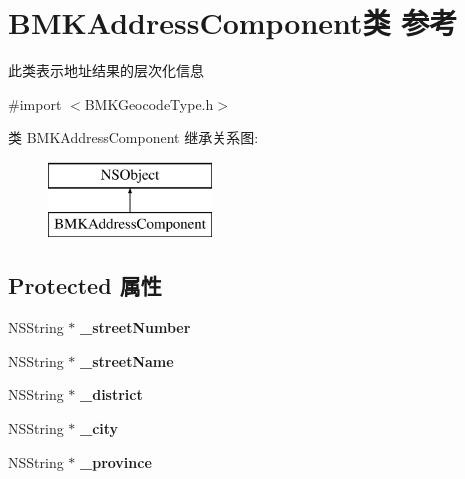 \hypertarget{interface_b_m_k_address_component}{\section{B\+M\+K\+Address\+Component类 参考}
\label{interface_b_m_k_address_component}
}


此类表示地址结果的层次化信息  




{\ttfamily \#import $<$B\+M\+K\+Geocode\+Type.\+h$>$}

类 B\+M\+K\+Address\+Component 继承关系图\+:\begin{figure}[H]
\begin{center}
\leavevmode
\includegraphics[height=2.000000cm]{interface_b_m_k_address_component}
\end{center}
\end{figure}
\subsection*{Protected 属性}
\begin{DoxyCompactItemize}
\item 
\hypertarget{interface_b_m_k_address_component_aa0266bba479e431954882b7ab5cbfa07}{N\+S\+String $\ast$ {\bfseries \+\_\+street\+Number}}\label{interface_b_m_k_address_component_aa0266bba479e431954882b7ab5cbfa07}

\item 
\hypertarget{interface_b_m_k_address_component_a8eb365c63cc3c5993b597658fc398181}{N\+S\+String $\ast$ {\bfseries \+\_\+street\+Name}}\label{interface_b_m_k_address_component_a8eb365c63cc3c5993b597658fc398181}

\item 
\hypertarget{interface_b_m_k_address_component_af95961f735ab9789f2be5e11a3ff6875}{N\+S\+String $\ast$ {\bfseries \+\_\+district}}\label{interface_b_m_k_address_component_af95961f735ab9789f2be5e11a3ff6875}

\item 
\hypertarget{interface_b_m_k_address_component_aedb7357a02424464616394fb9b051c56}{N\+S\+String $\ast$ {\bfseries \+\_\+city}}\label{interface_b_m_k_address_component_aedb7357a02424464616394fb9b051c56}

\item 
\hypertarget{interface_b_m_k_address_component_a233c3fae615c60ff44ce462fe7de7e30}{N\+S\+String $\ast$ {\bfseries \+\_\+province}}\label{interface_b_m_k_address_component_a233c3fae615c60ff44ce462fe7de7e30}

\end{DoxyCompactItemize}
